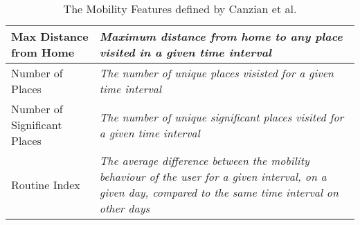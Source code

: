 \begin{table}[h]
\begin{tabular}{|p{}|p{}|}
Max Distance from Home       & \textit{Maximum distance from home to any place visited in a given time interval}                                                                                 \\ \hline
Number of Places             & \textit{The number of unique places visisted for a given time interval}                                                                                           \\ \hline
Number of Significant Places & \textit{The number of unique significant places visited for a given time interval}                                                                                \\ \hline
Routine Index                & \textit{The average difference between the mobility behaviour of the user for a given interval, on a given day, compared to the same time interval on other days} \\ \hline
\end{tabular}
    \caption{The Mobility Features defined by Canzian et al. \cite{Canzian2015}}
    \label{tab:canzian-features}
\end{table}


